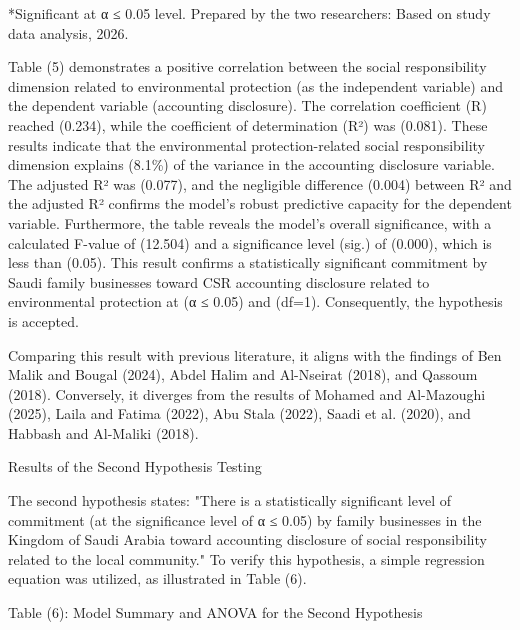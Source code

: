 \documentclass[10pt]{NSP1}
\begin{document}
*Significant at α ≤ 0.05 level. Prepared by the two researchers: Based on study data analysis, 2026.

Table (5) demonstrates a positive correlation between the social responsibility dimension related to environmental protection (as the independent variable) and the dependent variable (accounting disclosure). The correlation coefficient (R) reached (0.234), while the coefficient of determination (R²) was (0.081). These results indicate that the environmental protection-related social responsibility dimension explains (8.1\%) of the variance in the accounting disclosure variable. The adjusted R² was (0.077), and the negligible difference (0.004) between R² and the adjusted R² confirms the model’s robust predictive capacity for the dependent variable. Furthermore, the table reveals the model's overall significance, with a calculated F-value of (12.504) and a significance level (sig.) of (0.000), which is less than (0.05). This result confirms a statistically significant commitment by Saudi family businesses toward CSR accounting disclosure related to environmental protection at (α ≤ 0.05) and (df=1). Consequently, the hypothesis is accepted.

Comparing this result with previous literature, it aligns with the findings of Ben Malik and Bougal (2024), Abdel Halim and Al-Nseirat (2018), and Qassoum (2018). Conversely, it diverges from the results of Mohamed and Al-Mazoughi (2025), Laila and Fatima (2022), Abu Stala (2022), Saadi et al. (2020), and Habbash and Al-Maliki (2018).

Results of the Second Hypothesis Testing

The second hypothesis states: "There is a statistically significant level of commitment (at the significance level of α ≤ 0.05) by family businesses in the Kingdom of Saudi Arabia toward accounting disclosure of social responsibility related to the local community." To verify this hypothesis, a simple regression equation was utilized, as illustrated in Table (6).

Table (6): Model Summary and ANOVA for the Second Hypothesis
\end{document}

